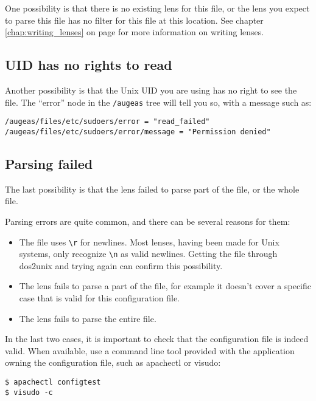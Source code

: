 One possibility is that there is no existing lens for this file, or the lens you expect to parse this file has no filter for this file at this location. See chapter \ref{chap:writing_lenses} on page \pageref{chap:writing_lenses} for more information on writing lenses.

\subsection{UID has no rights to read}

Another possibility is that the Unix UID you are using has no right to see the file. The ``error'' node in the \verb!/augeas! tree will tell you so, with a message such as:


\begin{verbatim}
/augeas/files/etc/sudoers/error = "read_failed"
/augeas/files/etc/sudoers/error/message = "Permission denied"
\end{verbatim}

\subsection{Parsing failed}

The last possibility is that the lens failed to parse part of the file, or the whole file.

Parsing errors are quite common, and there can be several reasons for them:

\begin{itemize}
\item
  The file uses \verb!\r! for newlines. Most lenses, having been made for Unix systems, only recognize \verb!\n! as valid newlines. Getting the file through dos2unix and trying again can confirm this possibility.
\item
  The lens fails to parse a part of the file, for example it doesn't cover a specific case that is valid for this configuration file.
\item
  The lens fails to parse the entire file.
\end{itemize}
In the last two cases, it is important to check that the configuration file is indeed valid. When available, use a command line tool provided with the application owning the configuration file, such as apachectl or visudo:

\begin{verbatim}
$ apachectl configtest
$ visudo -c
\end{verbatim}

